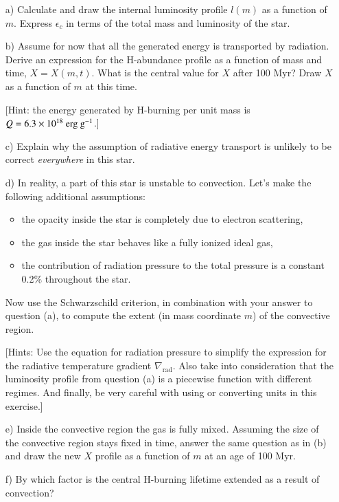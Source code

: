 \documentclass[a4paper,11pt]{article}
\begin{document}
\begin{itemize}
\item[a)] Calculate and draw the internal luminosity profile $l(m)$ as a function of $m$. Express $\epsilon_c$ in terms of the total mass and luminosity of the star.

\item[b)] Assume for now that all the generated energy is transported by radiation. Derive an expression for the H-abundance profile as a function of mass and time, $X=X(m,t)$. What is the central value for $X$ after 100 Myr? Draw $X$ as a function of $m$ at this time.

[Hint: the energy generated by H-burning per unit mass is $Q=6.3\times10^{18} {\rm~erg~g^{-1}}$.]

\item[c)] Explain why the assumption of radiative energy transport is unlikely to be correct \emph{everywhere} in this star.

\item[d)] In reality, a part of this star is unstable to convection. Let's make the following additional assumptions: 
\begin{itemize}
\item the opacity inside the star is completely due to electron scattering, 
\item the gas inside the star behaves like a fully ionized ideal gas,
\item the contribution of radiation pressure to the total pressure is a constant 0.2\% throughout the star. 
\end{itemize}
Now use the Schwarzschild criterion, in combination with your answer to question (a), to compute the extent (in mass coordinate $m$) of the convective region.

[Hints: Use the equation for radiation pressure to simplify the expression for the radiative temperature gradient $\nabla_\mathrm{rad}$. Also take into consideration that the luminosity profile from question (a) is a piecewise function with different regimes. And finally, be very careful with using or converting units in this exercise.]

\item[e)] Inside the convective region the gas is fully mixed. Assuming the size of the convective region stays fixed in time, answer the same question as in (b) and draw the new $X$ profile as a function of $m$ at an age of 100 Myr. 

\item[f)] By which factor is the central H-burning lifetime extended as a result of convection?

\end{itemize}
	
            
\end{document}
